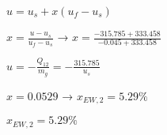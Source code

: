 \( u = u_s + x (u_f - u_s) \)  

\( x = \frac{u - u_s}{u_f - u_s} \) → \( x = \frac{-315.785 + 333.458}{-0.045 + 333.458} \)  

\( u = -\frac{Q_{12}}{m_g} = -\frac{315.785}{u_s} \)  

\( x = 0.0529 \) → \( x_{EW,2} = 5.29\% \)  

\( x_{EW,2} = 5.29\% \)
